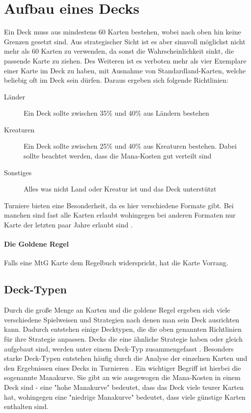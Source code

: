 \section{Aufbau eines Decks}\label{ch:grundlagen:deck}
Ein Deck muss aus mindestens 60 Karten bestehen, wobei nach oben hin keine Grenzen gesetzt sind. Aus strategischer Sicht ist es aber sinnvoll möglichst nicht mehr als 60 Karten zu verwenden, da sonst die Wahrscheinlichkeit sinkt, die passende Karte zu ziehen. Des Weiteren ist es verboten mehr als vier Exemplare einer Karte im Deck zu haben, mit Ausnahme von Standardland-Karten, welche beliebig oft im Deck sein dürfen. Daraus ergeben sich folgende Richtlinien: \cite{rulebook:2013}
\begin{description}
    \item[Länder] Ein Deck sollte zwischen 35\% und 40\% aus Ländern bestehen
    \item[Kreaturen] Ein Deck sollte zwischen 25\% und 40\% aus Kreaturen bestehen. Dabei sollte beachtet werden, dass die Mana-Kosten gut verteilt sind
    \item[Sonstiges] Alles was nicht Land oder Kreatur ist und das Deck unterstützt
\end{description}

Turniere bieten eine Besonderheit, da es hier verschiedene Formate gibt. Bei manchen sind fast alle Karten erlaubt wohingegen bei anderen Formaten nur Karte der letzten paar Jahre erlaubt sind \cite{wotc:gameplay}.

\paragraph{Die Goldene Regel} Falls eine \ac{MtG} Karte dem Regelbuch widerspricht, hat die Karte Vorrang.  \cite{rulebook:2013}

\subsection{Deck-Typen}
Durch die große Menge an Karten und die goldene Regel ergeben sich viele verschiedene Spielweisen und Strategien nach denen man sein Deck ausrichten kann. Dadurch entstehen einige Decktypen, die die oben genannten Richtlinien für ihre Strategie anpassen. Decks die eine ähnliche Strategie haben oder gleich aufgebaut sind, werden unter einem Deck-Typ zusammengefasst \cite{haumagic}. Besonders starke Deck-Typen entstehen häufig durch die Analyse der einzelnen Karten und den Ergebnissen eines Decks in Turnieren \cite{haumagic}. Ein wichtiger Begriff ist hierbei die sogenannte Manakurve. Sie gibt an wie ausgewogen die Mana-Kosten in einem Deck sind - eine "hohe Manakurve" bedeutet, dass das Deck viele teurer Karten hat, wohingegen eine "niedrige Manakurve" bedeutet, dass viele günstige Karten enthalten sind. 

